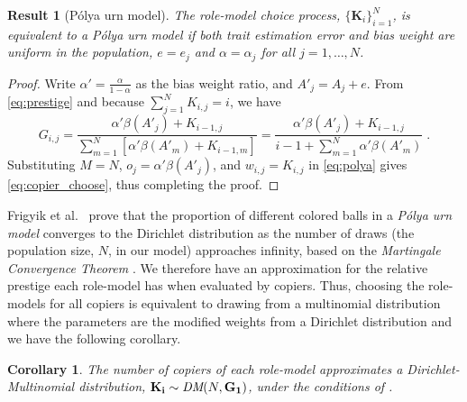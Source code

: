\documentclass[12pt]{extarticle}
\let\vec\mathbf
\newtheorem{corollary}{Corollary}
\newtheorem{result}{Result}
\begin{document}
\begin{result}[P{\'{o}}lya urn model]\label{result:polya}
The role-model choice process, $\big\{\vec{K}_i\big\}_{i=1}^N$, is equivalent to a \emph{P\'{o}lya urn model} if both trait estimation error and bias weight are uniform in the population, $e=e_j$ and $\alpha=\alpha_j$ for all $j=1,\ldots,N$.
\end{result}

\begin{proof} 
{Write} $\alpha'=\frac{\alpha}{1-\alpha}$ as the bias weight ratio, and $A'_j=A_j+e$. From \cref{eq:prestige} and because $\sum_{j=1}^{N}{K_{i,j}}=i$, we have
\begin{equation}\label{eq:copier_choose}
G_{i,j} = 
\frac{\alpha'\beta(A'_j) + K_{i-1,j}}{\sum\limits_{m=1}^{N}{\left[ \alpha'\beta(A'_m) + K_{i-1,m}\right]}}
 =\frac{\alpha'\beta(A'_j) + K_{i-1,j}}{i-1 + \sum\limits_{m=1}^{N}\alpha'\beta(A'_m)} \;.
\end{equation}
Substituting $M=N$, $o_j = \alpha'\beta(A'_j)$, and $w_{i,j} = K_{i,j}$ in \cref{eq:polya} gives \cref{eq:copier_choose}, thus completing the proof.
\end{proof} 

Frigyik et al.~\citep[section 2]{dirichlet} prove that the proportion of different colored balls in a \emph{P\'{o}lya urn model} converges to the Dirichlet distribution as the number of draws  (the population size, $N$, in our model) approaches infinity, based on the \emph{Martingale Convergence Theorem} \citep{martingaleBook}.
We therefore have an approximation for the relative prestige each role-model has when evaluated by copiers. Thus, choosing the role-models for all copiers is equivalent to drawing from a {multinomial} distribution where the parameters are the modified weights from a Dirichlet distribution and we have the following corollary.
\\

\begin{corollary}\label{cor:dirichlet}
The number of copiers of each role-model {approximates} a Dirichlet-Multinomial distribution, $\vec{K_i} \sim \emph{DM}(N,\vec{G_1})$, under the conditions of .
\end{corollary}
\end{document}
